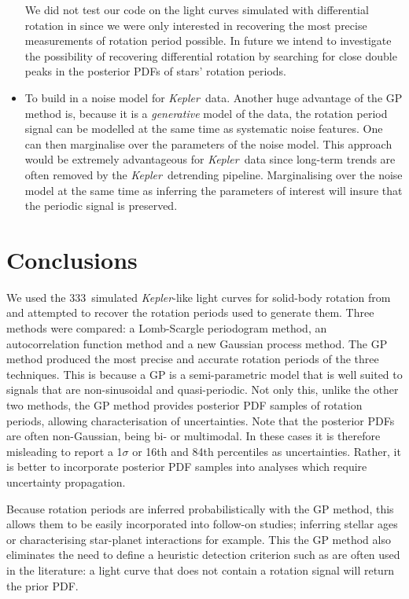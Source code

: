 \documentclass[useAMS, usenatbib, preprint, 12pt]{aastex}
\newcommand{\naigrain}{333}
\newcommand{\Kepler}{{\it Kepler}}
\newcommand{\kepler}{\Kepler}
\begin{document}
\begin{itemize}
{We did not test our code on the light curves simulated with differential
rotation in \citet{Aigrain2015} since we were only interested in recovering
the most precise measurements of rotation period possible.
In future we intend to investigate the possibility of recovering
differential rotation by searching for close double peaks in the posterior
PDFs of stars' rotation periods.}
\item{To build in a noise model for \kepler\ data.
Another huge advantage of the GP method is, because it is a {\it generative}
model of the data, the rotation period signal can be modelled at the same time
as systematic noise features.
One can then marginalise over the parameters of the noise model.
This approach would be extremely advantageous for \kepler\ data since
long-term trends are often removed by the \kepler\ detrending pipeline.
Marginalising over the noise model at the same time as inferring the
parameters of interest will insure that the periodic signal is preserved.}
\end{itemize}

\section{Conclusions}

We used the \naigrain\ simulated \kepler-like light curves for solid-body
rotation from \citet{Aigrain2015} and attempted to recover the rotation
periods used to generate them.
Three methods were compared: a Lomb-Scargle periodogram method, an
autocorrelation function method and a new Gaussian process method.
The GP method produced the most precise and accurate rotation periods of the
three techniques.
This is because a GP is a semi-parametric model that is well suited to signals
that are non-sinusoidal and quasi-periodic.
Not only this, unlike the other two methods, the GP method provides posterior
PDF samples of rotation periods, allowing characterisation of uncertainties.
Note that the posterior PDFs are often non-Gaussian, being bi- or multimodal.
In these cases it is therefore misleading to report a 1$\sigma$ or 16th and
84th percentiles as uncertainties.
Rather, it is better to incorporate posterior PDF samples into analyses which
require uncertainty propagation.

Because rotation periods are inferred probabilistically with the GP method,
this allows them to be easily incorporated into follow-on studies; inferring
stellar ages or characterising star-planet interactions for example.
This the GP method also eliminates the need to define a heuristic detection
criterion such as are often used in the literature: a light curve that does
not contain a rotation signal will return the prior PDF.
\end{document}
